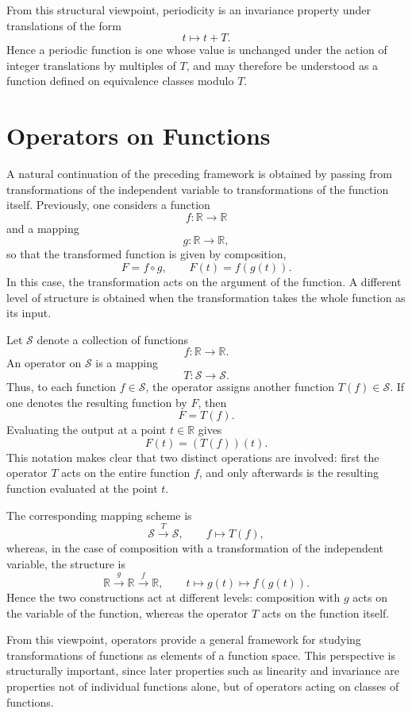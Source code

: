 \documentclass{article}
\begin{document}
	From this structural viewpoint, periodicity is an invariance property under translations of the form
	\[
	t\mapsto t+T.
	\]
	Hence a periodic function is one whose value is unchanged under the action of integer translations by multiples of \(T\), and may therefore be understood as a function defined on equivalence classes modulo \(T\).
	
	\section*{Operators on Functions}
	
	A natural continuation of the preceding framework is obtained by passing from transformations of the independent variable to transformations of the function itself. Previously, one considers a function
	\[
	f:\mathbb{R}\to\mathbb{R}
	\]
	and a mapping
	\[
	g:\mathbb{R}\to\mathbb{R},
	\]
	so that the transformed function is given by composition,
	\[
	F=f\circ g,
	\qquad
	F(t)=f(g(t)).
	\]
	In this case, the transformation acts on the argument of the function. A different level of structure is obtained when the transformation takes the whole function as its input.
	
	Let \(\mathcal{S}\) denote a collection of functions
	\[
	f:\mathbb{R}\to\mathbb{R}.
	\]
	An operator on \(\mathcal{S}\) is a mapping
	\[
	T:\mathcal{S}\to\mathcal{S}.
	\]
	Thus, to each function \(f\in\mathcal{S}\), the operator assigns another function \(T(f)\in\mathcal{S}\). If one denotes the resulting function by \(F\), then
	\[
	F=T(f).
	\]
	Evaluating the output at a point \(t\in\mathbb{R}\) gives
	\[
	F(t)=(T(f))(t).
	\]
	This notation makes clear that two distinct operations are involved: first the operator \(T\) acts on the entire function \(f\), and only afterwards is the resulting function evaluated at the point \(t\).
	
	The corresponding mapping scheme is
	\[
	\mathcal{S}\xrightarrow{\;T\;}\mathcal{S},
	\qquad
	f\longmapsto T(f),
	\]
	whereas, in the case of composition with a transformation of the independent variable, the structure is
	\[
	\mathbb{R}\xrightarrow{\;g\;}\mathbb{R}\xrightarrow{\;f\;}\mathbb{R},
	\qquad
	t\longmapsto g(t)\longmapsto f(g(t)).
	\]
	Hence the two constructions act at different levels: composition with \(g\) acts on the variable of the function, whereas the operator \(T\) acts on the function itself.
	
	From this viewpoint, operators provide a general framework for studying transformations of functions as elements of a function space. This perspective is structurally important, since later properties such as linearity and invariance are properties not of individual functions alone, but of operators acting on classes of functions.
	
\end{document}
